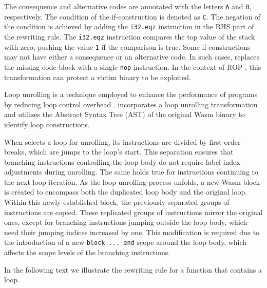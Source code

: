 The consequence and alternative codes are annotated with the letters \texttt{A} and \texttt{B}, respectively.
The condition of the if-construction is denoted as \texttt{C}.
The negation of the condition is achieved by adding the \texttt{i32.eqz} instruction in the RHS part of the rewriting rule.
The \texttt{i32.eqz} instruction compares the top value of the stack with zero, pushing the value \texttt{1} if the comparison is true.
Some if-constructions may not have either a consequence or an alternative code.
In such cases, \tool replaces the missing code block with a single \texttt{nop} instruction.
In the context of ROP \cite{Swivel}, this transformation can protect a victim binary to be exploited. 



Loop unrolling is a technique employed to enhance the performance of programs by reducing loop control overhead \cite{dongarra1979unrolling}. 
\tool incorporates a loop unrolling transformation and utilizes the Abstract Syntax Tree (AST) of the original Wasm binary to identify loop constructions. 

When \tool selects a loop for unrolling, its instructions are divided by first-order breaks, which are jumps to the loop's start. This separation ensures that branching instructions controlling the loop body do not require label index adjustments during unrolling. The same holds true for instructions continuing to the next loop iteration.
As the loop unrolling process unfolds, a new Wasm block is created to encompass both the duplicated loop body and the original loop. 
Within this newly established block, the previously separated groups of instructions are copied. 
These replicated groups of instructions mirror the original ones, except for branching instructions jumping outside the loop body, which need their jumping indices increased by one. This modification is required due to the introduction of a new \texttt{block ... end} scope around the loop body, which affects the scope levels of the branching instructions.

In the following text we illustrate the rewriting rule for a function that contains a loop. 



